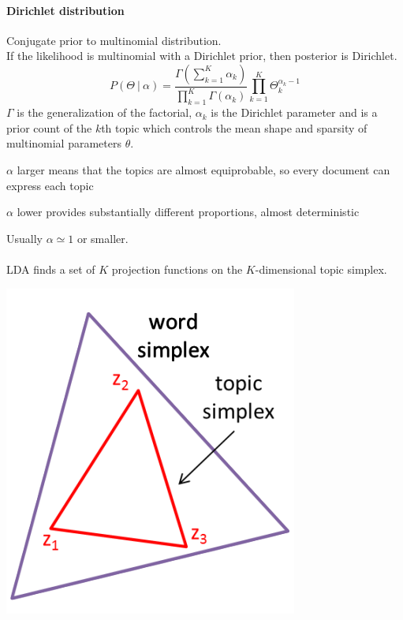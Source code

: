 \documentclass[10pt]{report}
\begin{document}
\paragraph{Dirichlet distribution} Conjugate prior to multinomial distribution.\\
If the likelihood is multinomial with a Dirichlet prior, then posterior is Dirichlet.
$$P(\Theta\:|\:\alpha) = \frac{\displaystyle \Gamma\left(\sum_{k=1}^K \alpha_k\right)}{\displaystyle \prod_{k=1}^K\Gamma(\alpha_k)}\prod_{k=1}^K\Theta_k^{\alpha_k-1}$$
$\Gamma$ is the generalization of the factorial, $\alpha_k$ is the Dirichlet parameter and is a prior count of the $k$th topic which controls the mean shape and sparsity of multinomial parameters $\theta$.
\begin{list}{}{}
	\item $\alpha$ larger means that the topics are almost equiprobable, so every document can express each topic
	\item $\alpha$ lower provides substantially different proportions, almost deterministic
\end{list}
Usually $\alpha \simeq 1$ or smaller.\\\\
LDA finds a set of $K$ projection functions on the $K$-dimensional topic simplex.\begin{center}
	\includegraphics[scale=0.5]{41.png}
\end{center}
\end{document}
